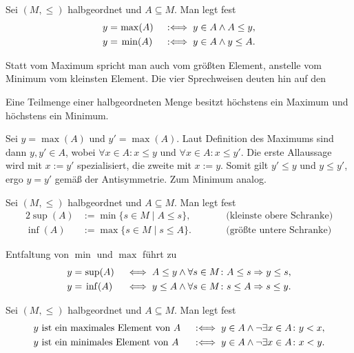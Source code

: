 \begin{Definition}\newlinefirst
Sei $(M,\le)$ halbgeordnet und $A\subseteq M$. Man legt fest
\begin{alignat*}{3}
y = &\hspace{1.4pt}\max(A)\,&\;:\Longleftrightarrow\; y\in A\land A\le y,\\
y = &\hspace{2.4pt}\min(A)\,&\;:\Longleftrightarrow\; y\in A\land y\le A.
\end{alignat*}
\end{Definition}

\noindent
Statt vom Maximum spricht man auch vom größten Element,
anstelle vom Minimum vom kleinsten Element. Die vier Sprechweisen
deuten hin auf den

\begin{Satz}
Eine Teilmenge einer halbgeordneten Menge besitzt höchstens ein Maximum
und höchstens ein Minimum.
\end{Satz}
\begin{Beweis}
Sei $y=\max(A)$ und $y'=\max(A)$. Laut Definition des
Maximums sind dann $y,y'\in A$, wobei $\forall x\in A\colon x\le y$
und $\forall x\in A\colon x\le y'$. Die erste Allaussage wird
mit $x:=y'$ spezialisiert, die zweite mit $x:=y$. Somit
gilt $y'\le y$ und $y\le y'$, ergo $y=y'$ gemäß der Antisymmetrie.
Zum Minimum analog.\,\qedsymbol
\end{Beweis}

\begin{Definition}\newlinefirst
Sei $(M,\le)$ halbgeordnet und $A\subseteq M$. Man legt fest
\begin{alignat*}{2}
\sup(A) &:= \min\{s\in M\mid A\le s\},&&\qquad\text{(kleinste obere Schranke)}\\
\inf(A) &:= \max\{s\in M\mid s\le A\}.&&\qquad\text{(größte untere Schranke)}
\end{alignat*}
\end{Definition}
Entfaltung von $\min$ und $\max$ führt zu
\begin{alignat*}{2}
y = &\hspace{1.4pt}\sup(A) &&\iff A\le y\land\forall s\in M\colon A\le s\Rightarrow y\le s,\\
y = &\hspace{2.4pt}\inf(A) &&\iff y\le A\land\forall s\in M\colon s\le A\Rightarrow s\le y.
\end{alignat*}

\begin{Definition}\newlinefirst
Sei $(M,\le)$ halbgeordnet und $A\subseteq M$. Man legt fest
\begin{alignat*}{2}
&\text{$y$ ist ein maximales Element von $A$}&&\;:\Longleftrightarrow\; y\in A\land\lnot\exists x\in A\colon y<x,\\
&\text{$y$ ist ein minimales Element von $A$}&&\;:\Longleftrightarrow\; y\in A\land\lnot\exists x\in A\colon x<y.
\end{alignat*}
\end{Definition}

